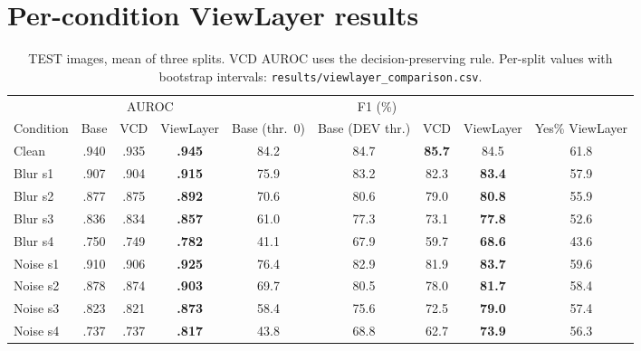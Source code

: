 \documentclass[10pt,a4paper]{article}
\newcommand{\code}[1]{\texttt{\small #1}}
\newcommand{\ours}{ViewLayer}
\begin{document}
\section{Per-condition ViewLayer results}\label{app:full}
\begin{table}[H]
\centering\small
\caption{TEST images, mean of three splits. VCD AUROC uses the decision-preserving rule. Per-split values with bootstrap intervals: \code{results/viewlayer\_comparison.csv}.}
\begin{tabular}{@{}l ccc cccc c@{}}
\toprule
 & \multicolumn{3}{c}{AUROC} & \multicolumn{4}{c}{F1 (\%)} & \\
\cmidrule(lr){2-4}\cmidrule(lr){5-8}
Condition & Base & VCD & \ours{} & Base (thr.\ 0) & Base (DEV thr.) & VCD & \ours{} & Yes\% \ours{}\\
\midrule
Clean    & .940 & .935 & \textbf{.945} & 84.2 & 84.7 & \textbf{85.7} & 84.5 & 61.8\\
\addlinespace
Blur s1  & .907 & .904 & \textbf{.915} & 75.9 & 83.2 & 82.3 & \textbf{83.4} & 57.9\\
Blur s2  & .877 & .875 & \textbf{.892} & 70.6 & 80.6 & 79.0 & \textbf{80.8} & 55.9\\
Blur s3  & .836 & .834 & \textbf{.857} & 61.0 & 77.3 & 73.1 & \textbf{77.8} & 52.6\\
Blur s4  & .750 & .749 & \textbf{.782} & 41.1 & 67.9 & 59.7 & \textbf{68.6} & 43.6\\
\addlinespace
Noise s1 & .910 & .906 & \textbf{.925} & 76.4 & 82.9 & 81.9 & \textbf{83.7} & 59.6\\
Noise s2 & .878 & .874 & \textbf{.903} & 69.7 & 80.5 & 78.0 & \textbf{81.7} & 58.4\\
Noise s3 & .823 & .821 & \textbf{.873} & 58.4 & 75.6 & 72.5 & \textbf{79.0} & 57.4\\
Noise s4 & .737 & .737 & \textbf{.817} & 43.8 & 68.8 & 62.7 & \textbf{73.9} & 56.3\\
\bottomrule
\end{tabular}
\end{table}
\end{document}
